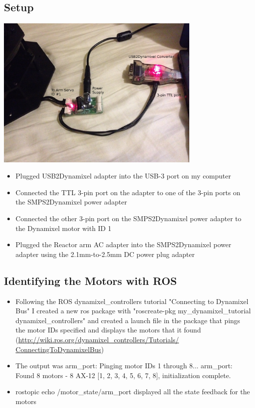 \documentclass[letterpaper, 10 pt]{article}
\begin{document}
  \subsection{Setup}
    \begin{center}
  	\includegraphics[width=10.0cm]{resources/usb2dxl-connections-labeled}
	\end{center}
    \begin{itemize}
      \item Plugged USB2Dynamixel adapter into the USB-3 port on my computer
      \item Connected the TTL 3-pin port on the adapter to one of the 3-pin ports on the SMPS2Dynamixel power adapter
      \item Connected the other 3-pin port on the SMPS2Dynamixel power adapter to the Dynamixel motor with ID 1
      \item Plugged the Reactor arm AC adapter into the SMPS2Dynamixel power adapter using the 2.1mm-to-2.5mm DC power plug adapter
    \end{itemize}
  \subsection{Identifying the Motors with ROS}
    \begin{itemize}
      \item Following the ROS dynamixel\_controllers tutorial "Connecting to Dynamixel Bus" I created a new ros package with "roscreate-pkg  my\_dynamixel\_tutorial dynamixel\_controllers" and created a launch file in the package that pings the motor IDs specified and displays the motors that it found (\url{http://wiki.ros.org/dynamixel_controllers/Tutorials/
ConnectingToDynamixelBus})
      \item The output was \newline
      [INFO] [WallTime: 1400874215.506928] arm\_port: Pinging motor IDs 1 through 8... \newline
      [INFO] [WallTime: 1400874215.949469] arm\_port: Found 8 motors - 8 AX-12 [1, 2, 3, 4, 5, 6, 7, 8], initialization complete.
      \item rostopic echo /motor\_state/arm\_port displayed all the state feedback for the motors
    \end{itemize}
\end{document}
